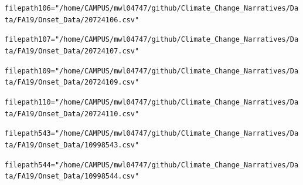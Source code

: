 \documentclass{article}\usepackage[]{graphicx}\usepackage[]{color}
\makeatletter
\newcommand{\hlstr}[1]{\textcolor[rgb]{0.192,0.494,0.8}{#1}}%
\newcommand{\hlstd}[1]{\textcolor[rgb]{0.345,0.345,0.345}{#1}}%
\newcommand{\hlkwb}[1]{\textcolor[rgb]{0.69,0.353,0.396}{#1}}%
\newenvironment{kframe}{%
 \def\at@end@of@kframe{}%
 \ifinner\ifhmode%
  \def\at@end@of@kframe{\end{minipage}}%
  \begin{minipage}{\columnwidth}%
 \fi\fi%
 \def\FrameCommand##1{\hskip\@totalleftmargin \hskip-\fboxsep
 \colorbox{shadecolor}{##1}\hskip-\fboxsep
     \hskip-\linewidth \hskip-\@totalleftmargin \hskip\columnwidth}%
 \MakeFramed {\advance\hsize-\width
   \@totalleftmargin\z@ \linewidth\hsize
   \@setminipage}}%
 {\par\unskip\endMakeFramed%
 \at@end@of@kframe}
\newenvironment{knitrout}{}{} %
\makeatother
\begin{document}
\begin{knitrout}
\color{fgcolor}\begin{kframe}
\begin{alltt}
\hlstd{filepath106} \hlkwb{=} \hlstr{"/home/CAMPUS/mwl04747/github/Climate_Change_Narratives/Data/FA19/Onset_Data/20724106.csv"}

\hlstd{filepath107} \hlkwb{=} \hlstr{"/home/CAMPUS/mwl04747/github/Climate_Change_Narratives/Data/FA19/Onset_Data/20724107.csv"}

\hlstd{filepath109} \hlkwb{=} \hlstr{"/home/CAMPUS/mwl04747/github/Climate_Change_Narratives/Data/FA19/Onset_Data/20724109.csv"}

\hlstd{filepath110} \hlkwb{=} \hlstr{"/home/CAMPUS/mwl04747/github/Climate_Change_Narratives/Data/FA19/Onset_Data/20724110.csv"}

\hlstd{filepath543} \hlkwb{=} \hlstr{"/home/CAMPUS/mwl04747/github/Climate_Change_Narratives/Data/FA19/Onset_Data/10998543.csv"}

\hlstd{filepath544} \hlkwb{=} \hlstr{"/home/CAMPUS/mwl04747/github/Climate_Change_Narratives/Data/FA19/Onset_Data/10998544.csv"}


\end{alltt}
\end{kframe}
\end{knitrout}
\end{document}

